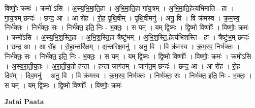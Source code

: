 \documentclass[17pt]{extarticle}
\begin{document}
विष्णोः॒ क्रमः॑ । क्रमो॑ ऽसि । अ॒स्य॒भि॒मा॒ति॒हा । अ॒भि॒मा॒ति॒हा गा॑य॒त्रम् । अ॒भि॒मा॒ति॒हेत्य॑भिमाति - हा । गा॒य॒त्रम् छन्दः॑ । छन्द॒ आ । आ रो॑ह । रो॒ह॒ पृ॒थि॒वीम् । पृ॒थि॒वीमनु॑ । अनु॒ वि । वि क्र॑मस्व । क्र॒म॒स्व॒ निर्भ॑क्तः । निर्भ॑क्तः॒ सः । निर्भ॑क्त॒ इति॒ निः - भ॒क्तः॒ । स यम् । यम् द्वि॒ष्मः । द्वि॒ष्मो विष्णोः᳚ । विष्णोः॒ क्रमः॑ । क्रमो॑ऽसि । अ॒स्य॒भि॒श॒स्ति॒हा । अ॒भि॒श॒स्ति॒हा त्रैष्टु॑भम् । अ॒भि॒श॒स्ति॒,हेत्य॑भिशस्ति - हा । त्रैष्टु॑भ॒म् छन्दः॑ । छन्द॒ आ । आ रो॑ह । रो॒हा॒न्तरि॑क्षम् । अ॒न्तरि॑क्ष॒मनु॑ । अनु॒ वि । वि क्र॑मस्व । क्र॒म॒स्व॒ निर्भ॑क्तः । निर्भ॑क्तः॒ सः । निर्भ॑क्त॒ इति॒ निः - भ॒क्तः॒ । 
स यम् । यम् द्वि॒ष्मः । द्वि॒ष्मो विष्णोः᳚ । विष्णोः॒ क्रमः॑ । क्रमो॑ऽसि । अ॒स्य॒रा॒ती॒य॒तः । अ॒रा॒ती॒य॒तो ह॒न्ता । ह॒न्ता जाग॑तम् । जाग॑त॒म् छन्दः॑ । छन्द॒ आ । आ रो॑ह । रो॒ह॒ दिव᳚म् । दिव॒मनु॑ । अनु॒ वि । वि क्र॑मस्व । क्र॒म॒स्व॒ निर्भ॑क्तः । निर्भ॑क्तः॒ सः । निर्भ॑क्त॒ इति॒ निः - भ॒क्तः॒ । स यम् । यम् द्वि॒ष्मः । द्वि॒ष्मो विष्णोः᳚ । विष्णोः॒ क्रमः॑ \newline

\textbf{Jatai Paata} \newline
\end{document}
